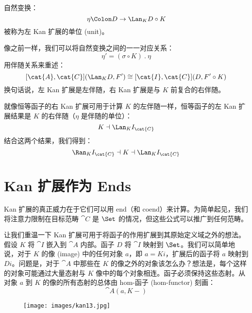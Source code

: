 \noindent
自然变换：
\[\eta \Colon D \to \Lan_{K}D \circ K\]
被称为左 Kan 扩展的单位 (unit)。

像之前一样，我们可以将自然变换之间的一一对应关系：
\[\eta' = (\sigma \circ K)\ .\ \eta\]
用伴随关系来重述：
\[[\cat{A}, \cat{C}](\Lan_{K}D, F') \cong [\cat{I}, \cat{C}](D, F' \circ K)\]
换句话说，左 Kan 扩展是左伴随，右 Kan 扩展是与 $K$ 前复合的右伴随。

就像恒等函子的右 Kan 扩展可用于计算 $K$ 的左伴随一样，恒等函子的左 Kan 扩展结果是 $K$ 的右伴随（$\eta$ 是伴随的单位）：
\[K \dashv \Lan_{K}I_{\cat{C}}\]
结合这两个结果，我们得到：
\[\Ran_{K}I_{\cat{C}} \dashv K \dashv \Lan_{K}I_{\cat{C}}\]

\section{Kan 扩展作为 Ends}

Kan 扩展的真正威力在于它们可以用 end（和 coend）来计算。为简单起见，我们将注意力限制在目标范畴 $\cat{C}$ 是 $\Set$ 的情况，但这些公式可以推广到任何范畴。

让我们重温一下 Kan 扩展可用于将函子的作用扩展到其原始定义域之外的想法。假设 $K$ 将 $\cat{I}$ 嵌入到 $\cat{A}$ 内部。函子 $D$ 将 $\cat{I}$ 映射到 $\Set$。我们可以简单地说，对于 $K$ 的像 (image) 中的任何对象 $a$，即 $a = K i$，扩展后的函子将 $a$ 映射到 $D i$。问题是，对于 $\cat{A}$ 中那些在 $K$ 的像之外的对象该怎么办？想法是，每个这样的对象可能通过大量态射与 $K$ 像中的每个对象相连。函子必须保持这些态射。从对象 $a$ 到 $K$ 的像的所有态射的总体由 hom-函子 (hom-functor) 刻画：
\[\cat{A}(a, K -)\]

\begin{figure}[H]
  \centering
  \texttt{[image: images/kan13.jpg]}
\end{figure}

